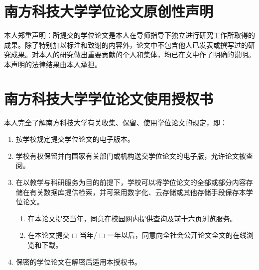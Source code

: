 \begin{statementcopyright}
  \vspace{2em}
  \section*{南方科技大学学位论文原创性声明}
  \vspace{1em}

    本人郑重声明：所提交的学位论文是本人在导师指导下独立进行研究工作所取得的成果。除了特别加以标注和致谢的内容外，论文中不包含他人已发表或撰写过的研究成果。对本人的研究做出重要贡献的个人和集体，均已在文中作了明确的说明。本声明的法律结果由本人承担。

  \authorsign

  \vspace{1em}
  \section*{南方科技大学学位论文使用授权书}
  \vspace{1em}

    本人完全了解南方科技大学有关收集、保留、使用学位论文的规定，即：

    \begin{enumerate}[wide]
      \item 按学校规定提交学位论文的电子版本。
      \item 学校有权保留并向国家有关部门或机构送交学位论文的电子版，允许论文被查阅。
      \item 在以教学与科研服务为目的前提下，学校可以将学位论文的全部或部分内容存储在有关数据库提供检索，并可采用数字化、云存储或其他存储手段保存本学位论文。
        \begin{enumerate}[wide,label={(\arabic*)}]
          \item 在本论文提交当年，同意在校园网内提供查询及前十六页浏览服务。
          \item 在本论文提交 $\mdlgwhtsquare$ 当年/ $\mdlgwhtsquare$ 一年以后，同意向全社会公开论文全文的在线浏览和下载。
        \end{enumerate}
      \item 保密的学位论文在解密后适用本授权书。
    \end{enumerate}

  \authorsupervisorsign

\end{statementcopyright}